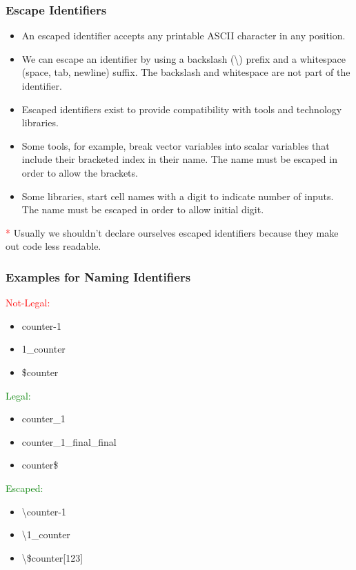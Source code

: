\documentclass[t, notes]{beamer}
\begin{document}
\begin{frame}
\frametitle{Escape Identifiers}

\begin{itemize}
\item An escaped identifier accepts any printable ASCII character in any position.
\item We can escape an identifier by using a backslash (\textbackslash) prefix and a whitespace (space, tab, newline) suffix. The backslash and whitespace are not part of the identifier.
\item Escaped identifiers exist to provide compatibility with tools and technology libraries. 
\item Some tools, for example, break vector variables into scalar variables that include their bracketed index in their name. The name must be escaped in order to allow the brackets.
\item Some libraries, start cell names with a digit to indicate number of inputs. The name must be escaped in order to allow initial digit.
\end{itemize}

\vfill

\textcolor{red}* Usually we shouldn't declare ourselves escaped identifiers because they make out code less readable.

\end{frame}

\begin{frame}
\frametitle{Examples for Naming Identifiers}
\textcolor{red}{Not-Legal:}
\begin{itemize}
\item counter-1
\item 1\_counter
\item \$counter
\end{itemize}

\textcolor{green}{Legal:}
\begin{itemize}
\item counter\_1
\item counter\_1\_final\_final
\item counter\$
\end{itemize}

\textcolor{green}{Escaped:}
\begin{itemize}
\item \textbackslash counter-1
\item \textbackslash 1\_counter
\item \textbackslash \$counter[123]
\end{itemize}
\end{frame}
\end{document}
